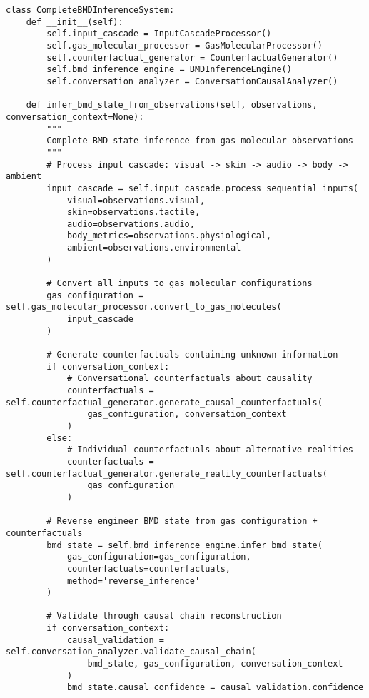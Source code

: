 \documentclass[11pt,a4paper]{article}
\begin{document}
\begin{lstlisting}[style=pythonstyle, caption=Complete Reverse BMD Inference System]
class CompleteBMDInferenceSystem:
    def __init__(self):
        self.input_cascade = InputCascadeProcessor()
        self.gas_molecular_processor = GasMolecularProcessor()
        self.counterfactual_generator = CounterfactualGenerator()
        self.bmd_inference_engine = BMDInferenceEngine()
        self.conversation_analyzer = ConversationCausalAnalyzer()
        
    def infer_bmd_state_from_observations(self, observations, conversation_context=None):
        """
        Complete BMD state inference from gas molecular observations
        """
        # Process input cascade: visual -> skin -> audio -> body -> ambient
        input_cascade = self.input_cascade.process_sequential_inputs(
            visual=observations.visual,
            skin=observations.tactile,
            audio=observations.audio, 
            body_metrics=observations.physiological,
            ambient=observations.environmental
        )
        
        # Convert all inputs to gas molecular configurations
        gas_configuration = self.gas_molecular_processor.convert_to_gas_molecules(
            input_cascade
        )
        
        # Generate counterfactuals containing unknown information
        if conversation_context:
            # Conversational counterfactuals about causality
            counterfactuals = self.counterfactual_generator.generate_causal_counterfactuals(
                gas_configuration, conversation_context
            )
        else:
            # Individual counterfactuals about alternative realities
            counterfactuals = self.counterfactual_generator.generate_reality_counterfactuals(
                gas_configuration
            )
        
        # Reverse engineer BMD state from gas configuration + counterfactuals
        bmd_state = self.bmd_inference_engine.infer_bmd_state(
            gas_configuration=gas_configuration,
            counterfactuals=counterfactuals,
            method='reverse_inference'
        )
        
        # Validate through causal chain reconstruction
        if conversation_context:
            causal_validation = self.conversation_analyzer.validate_causal_chain(
                bmd_state, gas_configuration, conversation_context
            )
            bmd_state.causal_confidence = causal_validation.confidence
        

\end{lstlisting}
\end{document}
